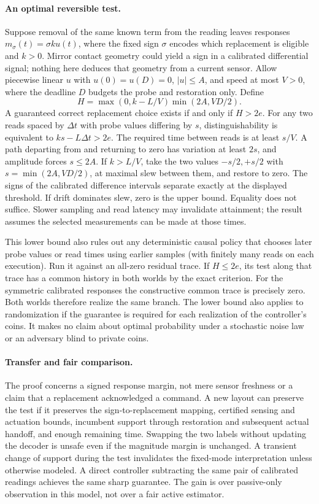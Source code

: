 \documentclass{article}
\begin{document}
\paragraph{An optimal reversible test.}
Suppose removal of the same known term from the reading leaves responses \(m_\sigma(t)=\sigma k u(t)\), where the fixed sign \(\sigma\) encodes which replacement is eligible and \(k>0\). Mirror contact geometry could yield a sign in a calibrated differential signal; nothing here deduces that geometry from a current sensor. Allow piecewise linear \(u\) with \(u(0)=u(D)=0\), \(|u|\le A\), and speed at most \(V>0\), where the deadline \(D\) budgets the probe and restoration only. Define
\[
       H=\max(0,k-L/V)\min(2A,VD/2).
\]
A guaranteed correct replacement choice exists if and only if \(H>2e\). For any two reads spaced by \(\Delta t\) with probe values differing by \(s\), distinguishability is equivalent to \(ks-L\Delta t>2e\). The required time between reads is at least \(s/V\). A path departing from and returning to zero has variation at least \(2s\), and amplitude forces \(s\le 2A\). If \(k>L/V\), take the two values \(-s/2,+s/2\) with \(s=\min(2A,VD/2)\), at maximal slew between them, and restore to zero. The signs of the calibrated difference intervals separate exactly at the displayed threshold. If drift dominates slew, zero is the upper bound. Equality does not suffice. Slower sampling and read latency may invalidate attainment; the result assumes the selected measurements can be made at those times.

This lower bound also rules out any deterministic causal policy that chooses later probe values or read times using earlier samples (with finitely many reads on each execution). Run it against an all-zero residual trace. If \(H\le 2e\), its test along that trace has a common history in both worlds by the exact criterion. For the symmetric calibrated responses the constructive common trace is precisely zero. Both worlds therefore realize the same branch. The lower bound also applies to randomization if the guarantee is required for each realization of the controller's coins. It makes no claim about optimal probability under a stochastic noise law or an adversary blind to private coins.

\paragraph{Transfer and fair comparison.}
The proof concerns a signed response margin, not mere sensor freshness or a claim that a replacement acknowledged a command. A new layout can preserve the test if it preserves the sign-to-replacement mapping, certified sensing and actuation bounds, incumbent support through restoration and subsequent actual handoff, and enough remaining time. Swapping the two labels without updating the decoder is unsafe even if the magnitude margin is unchanged. A transient change of support during the test invalidates the fixed-mode interpretation unless otherwise modeled. A direct controller subtracting the same pair of calibrated readings achieves the same sharp guarantee. The gain is over passive-only observation in this model, not over a fair active estimator.
\end{document}
